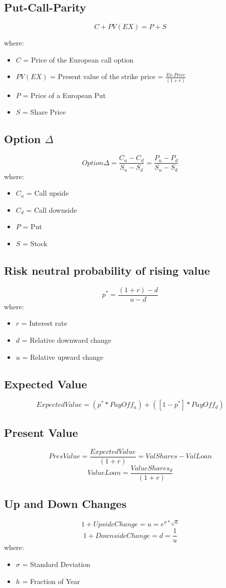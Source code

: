 \documentclass{cheatsheet}
\begin{document}
\subsection{Put-Call-Parity}
    \[
C + PV(EX) = P + S
\]

\noindent where:
\begin{itemize}
  \item $C$ = Price of the European call option
  \item $PV(EX)$ = Present value of the strike price = $\frac{Ex.Price}{(1+r)}$
  \item $P$ = Price of a European Put
  \item $S$ = Share Price
\end{itemize}
\subsection{Option $\Delta$}
\[Option \Delta = \frac{C_u - C_d}{S_u - S_d} = \frac{P_u - P_d}{S_u - S_d}\]
\noindent where:
\begin{itemize}
  \item $C_u$ = Call upside
  \item $C_d$ = Call downside
  \item $P$ = Put
  \item $S$ = Stock
\end{itemize}
\subsection{Risk neutral probability of rising value}
\[p^{*} = \frac{(1+r) - d}{u-d}\]
\noindent where:
\begin{itemize}
  \item $r$ = Interest rate
  \item $d$ = Relative downward change
  \item $u$ = Relative upward change
\end{itemize}
\subsection{Expected Value}
\[Expected Value = (p^{*} * PayOff_u) + ([1 - p^{*}] * PayOff_d)\]
\subsection{Present Value}
\[Pres Value = \frac{Expected Value}{(1+r)} = ValShares - ValLoan\]
\[Value Loan = \frac{ValueShares_d}{(1+r)}\]
\subsection{Up and Down Changes}
\[1 + UpsideChange = u = e^{\sigma*\sqrt{h}}\]
\[1 + DownsideChange = d = \frac{1}{u}\]
\noindent where:
\begin{itemize}
  \item $\sigma$ = Standard Deviation
  \item $h$ = Fraction of Year
\end{itemize}
\end{document}
